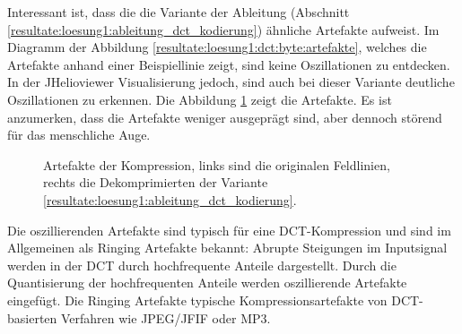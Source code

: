 Interessant ist, dass die die Variante der Ableitung (Abschnitt \ref{resultate:loesung1:ableitung_dct_kodierung}) ähnliche Artefakte aufweist. Im Diagramm der Abbildung \ref{resultate:loesung1:dct:byte:artefakte}, welches die Artefakte anhand einer Beispiellinie zeigt, sind keine Oszillationen zu entdecken. In der JHelioviewer Visualisierung jedoch, sind auch bei dieser Variante deutliche Oszillationen zu erkennen. Die Abbildung \ref{resultate:loesung1:dct:randbehandlung:jvhartefakte_loesung6} zeigt die Artefakte. Es ist anzumerken, dass die Artefakte weniger ausgeprägt sind, aber dennoch störend für das menschliche Auge.\\
\begin{figure}[!htbp]
	\center
	\caption{Artefakte der Kompression, links sind die originalen Feldlinien, rechts die Dekomprimierten der Variante \ref{resultate:loesung1:ableitung_dct_kodierung}.}
	\label{resultate:loesung1:dct:randbehandlung:jvhartefakte_loesung6}
\end{figure}
Die oszillierenden Artefakte sind typisch für eine DCT-Kompression und sind im Allgemeinen als Ringing Artefakte \cite{wiki:ringing:artefacts} bekannt: Abrupte Steigungen im Inputsignal werden in der DCT durch hochfrequente Anteile dargestellt. Durch die Quantisierung der hochfrequenten Anteile werden oszillierende Artefakte eingefügt. Die Ringing Artefakte typische Kompressionsartefakte von DCT-basierten Verfahren wie JPEG/JFIF oder MP3.\\
